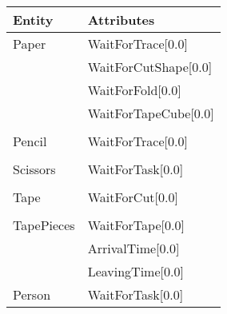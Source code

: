 \begin{tabular}{ll}
\toprule
Entity  & Attributes        \\ \midrule
Paper   & WaitForTrace[0.0]    \\
        & WaitForCutShape[0.0] \\
        & WaitForFold[0.0]     \\
        & WaitForTapeCube[0.0] \\
        &                      \\
Pencil  & WaitForTrace[0.0]    \\
        &                      \\
Scissors& WaitForTask[0.0]     \\
        &                      \\
Tape    & WaitForCut[0.0]      \\
        &                      \\
TapePieces  & WaitForTape[0.0] \\
        & ArrivalTime[0.0]     \\
        & LeavingTime[0.0]     \\
Person  & WaitForTask[0.0]     \\ \bottomrule
\end{tabular}
